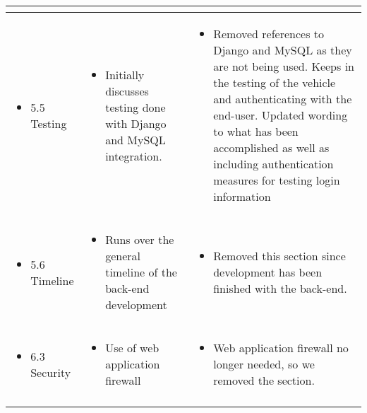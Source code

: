 \documentclass[onecolumn, draftclsnofoot,10pt, compsoc]{IEEEtran}
\begin{document}
\begin{longtable}{p{} | p{} | p{}}
\begin{itemize}
        \end{itemize}
        \\\hline
        \begin{itemize}
            \item 5.5 Testing
        \end{itemize}
        & \begin{itemize}
            \item Initially discusses testing done with Django and MySQL integration.
        \end{itemize}
        & \begin{itemize}
            \item Removed references to Django and MySQL as they are not being used. Keeps in the testing of the vehicle and authenticating with the end-user. Updated wording to what has been accomplished as well as including authentication measures for testing login information
        \end{itemize}
        \\\hline
        \begin{itemize}
            \item 5.6 Timeline
        \end{itemize}
        & \begin{itemize}
            \item Runs over the general timeline of the back-end development
        \end{itemize}
        & \begin{itemize}
            \item Removed this section since development has been finished with the back-end. 
        \end{itemize}
        \\\hline
        \begin{itemize}
            \item 6.3 Security
        \end{itemize}
        & \begin{itemize}
            \item Use of web application firewall
        \end{itemize}
        & \begin{itemize}
            \item Web application firewall no longer needed, so we removed the section.
        \end{itemize}
        \\\hline
        \begin{itemize}

\end{itemize}
\end{longtable}
\end{document}
